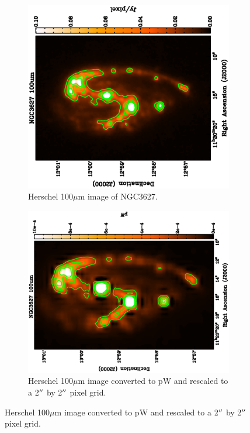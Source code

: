 \begin{figure}
  \centering
  \begin{subfigure}[t]{.48\textwidth}
    \centering
    \includegraphics[width=1.\linewidth, angle=270]{obs_imgs/100_orig.eps}
    \caption{Herschel 100$\mu$m image of NGC3627.}
  \end{subfigure}%
  \quad
  \begin{subfigure}[t]{.48\textwidth}
    \centering
    \includegraphics[width=1.\linewidth, angle=270]{obs_imgs/100_align.eps}
    \caption{Herschel 100$\mu$m image converted to pW and rescaled to a 2$\mbox{$^{\prime\prime}$}$ by 2$\mbox{$^{\prime\prime}$}$ pixel grid.}
  \end{subfigure}%


\end{figure}
